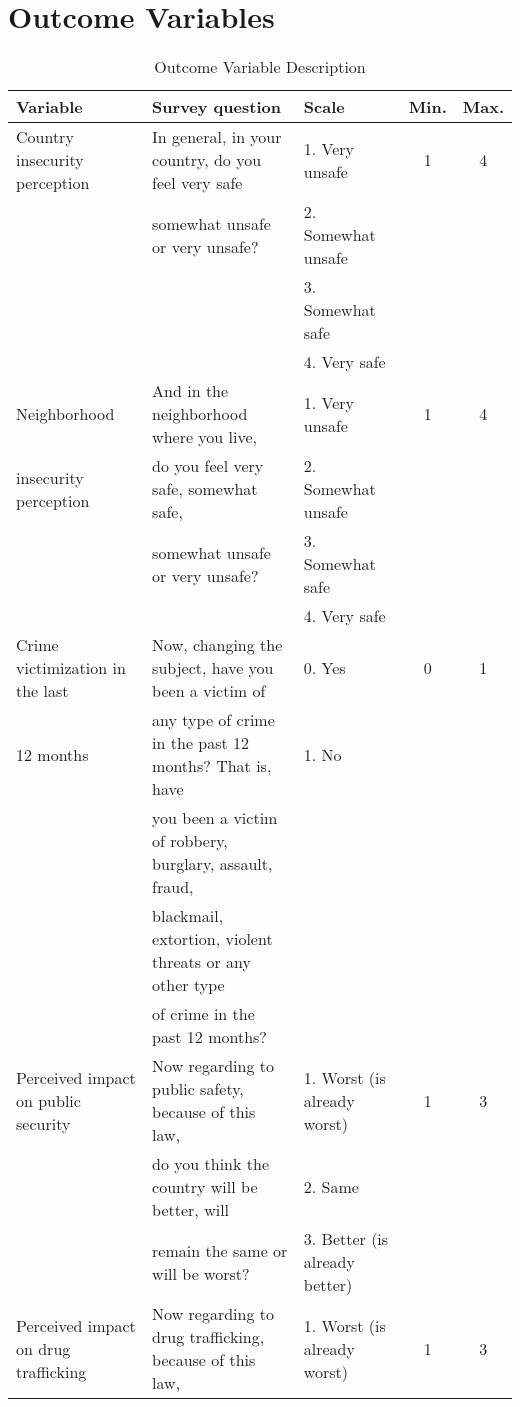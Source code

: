 
\section{Outcome Variables}\label{sec:outcome-variables}

\begin{table}[htbp]
\caption{Outcome Variable Description}\label{tab:outcome_variables_info}
\begin{tiny}
\begin{tabular}{lllcc}
\textbf{Variable }	&	\textbf{Survey question} 	&	\textbf{Scale}	&	\textbf{Min.}	&	\textbf{Max.}		\\	\hline
Country insecurity  perception	&	In general, in your country, do you feel very safe	&	1. Very unsafe 	&	1	&	4	\\
	&	somewhat unsafe or very unsafe?	&	2. Somewhat unsafe 	&		&		\\
	&		&	3. Somewhat safe 	&		&		\\
	&		&	4. Very safe 	&		&		\\\hline
Neighborhood 	&	And in the neighborhood where you live, 	&	1. Very unsafe 	&	1	&	4	\\
insecurity perception	&	do you feel very safe, somewhat safe,	&	2. Somewhat unsafe 	&		&		\\
	&	somewhat unsafe or very unsafe?	&	3. Somewhat safe 	&		&		\\
	&		&	4. Very safe 	&		&		\\\hline
Crime victimization in the last 	&	Now, changing the subject, have you been a victim of 	&	0. Yes	&	0	&	1	\\
12 months	&	any type of crime in the past 12 months? That is, have	&	1. No 	&		&		\\
	&	you been a victim of robbery, burglary, assault, fraud,	&		&		&		\\
	&	blackmail, extortion, violent threats or any other type	&		&		&		\\
	&	of crime in the past 12 months?	&		&		&		\\\hline
Perceived impact on public security	&	Now regarding to public safety, because of this law,	&	1.  Worst (is already worst)	&	1	&	3	\\
	&	 do you think the country will be better, will 	&	2. Same	&		&		\\
	&	remain the same or will be worst?	&	3. Better (is already better)	&		&		\\\hline
Perceived impact on drug trafficking	&	Now regarding to drug trafficking, because of this law,	&	1.  Worst (is already worst)	&	1	&	3	\\

\end{tabular}
\end{tiny}
\end{table}
